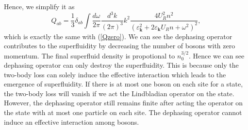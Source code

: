 \documentclass{article}
\newcommand{\tmmathbf}[1]{\ensuremath{\boldsymbol{#1}}}
\begin{document}
Hence, we simplify it as
\begin{equation}
  Q_{a b} = \frac{1}{3} \delta_{a b} \int \frac{d \omega}{2 \pi} \frac{d^3
  k}{(2 \pi)^3} k^2 \frac{4 U_R^2 n^2}{(\varepsilon_{\tmmathbf{k}}^2 + 2
  \varepsilon_{\tmmathbf{k}} U_R n + \omega^2)^2},
\end{equation}
which is exactly the same with (\ref{Qzero}). We can see the dephasing
operator contributes to the superfluidity by decreasing the number of bosons
with zero momentum. The final superfluid density is propotional to $n_0^{3 /
2}$. Hence we can see dephasing operator can only destroy the superfluidity.
This is because only the two-body loss can solely induce the effective
interaction which leads to the emergence of superfluidity. If there is at most
one boson on each site for a state, the two-body loss will vanish if we act
the Lindbladian operator on the state. However, the dephasing operator still
remains finite after acting the operator on the state with at most one
particle on each site. The dephasing operator cannot induce an effective
interaction among bosons.

\


\[ \  \]
\end{document}

